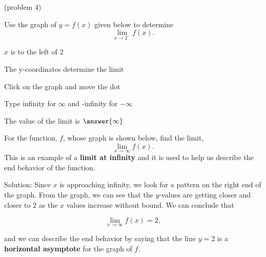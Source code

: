 \documentclass[handout]{ximera}
\begin{document}
\begin{problem}(problem 4)

  Use the graph of $y = f(x)$ given below to determine
  \[
  \lim_{x\to 2^-} f(x).
  \]
  
    \begin{hint}
      $x$ is to the left of 2
    \end{hint}
    \begin{hint}
      The y-coordinates determine the limit
    \end{hint}
		\begin{hint}
		  Click on the graph and move the dot
		\end{hint}
		\begin{hint}
		 Type infinity for $\infty$ and -infinity for $-\infty$
		\end{hint}
		The value of the limit is
		 $\answer{\infty}$


	
\end{problem}

\begin{example}[example 5]
For the function, $f$, whose graph is shown below, find the limit,
\[
\lim_{x \to \infty}f(x).
\] 
This is an example of a \textbf{limit at infinity} and it is used to help 
us describe the end behavior of the function.




\vspace{.25in}
Solution:  Since $x$ is approaching infinity, we look for a pattern on the right end of the graph.  
From the graph, we can see that the $y$-values are getting closer and closer to $2$ as the $x$ values 
increase without bound. We can conclude that 

\[
\lim_{x \to \infty}f(x) = 2,
\]

and we can describe the end behavior by saying that the line $y = 2$ is a \textbf{horizontal asymptote} for the graph of $f$.


\end{example}
\end{document}
